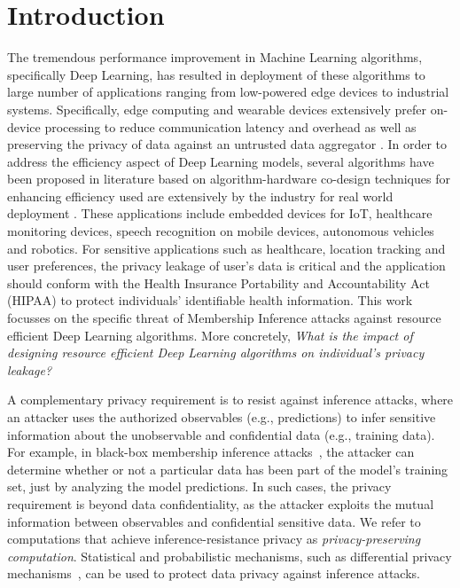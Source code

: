 \section{Introduction}\label{introduction}

The tremendous performance improvement in Machine Learning algorithms, specifically Deep Learning, has resulted in deployment of these algorithms to large number of applications ranging from low-powered edge devices to industrial systems.
Specifically, edge computing and wearable devices extensively prefer on-device processing to reduce communication latency and overhead as well as preserving the privacy of data against an untrusted data aggregator \cite{8110880}.
In order to address the efficiency aspect of Deep Learning models, several algorithms have been proposed in literature based on algorithm-hardware co-design techniques for enhancing efficiency used are extensively by the industry for real world deployment \cite{8114708}.
These applications include embedded devices for IoT, healthcare monitoring devices, speech recognition on mobile devices, autonomous vehicles and robotics.
For sensitive applications such as healthcare, location tracking and user preferences, the privacy leakage of user's data is critical and the application should conform with the Health Insurance Portability and Accountability Act (HIPAA) to protect individuals' identifiable health information.
This work focusses on the specific threat of Membership Inference attacks against resource efficient Deep Learning algorithms.
More concretely, \textit{What is the impact of designing resource efficient Deep Learning algorithms on individual's privacy leakage?}


A complementary privacy requirement is to resist against inference attacks, where an attacker uses the authorized observables (e.g., predictions) to infer sensitive information about the unobservable and confidential data (e.g., training data).  For example, in black-box membership inference attacks~\cite{shokri2017membership}, the attacker can determine whether or not a particular data has been part of the model's training set, just by analyzing the model predictions.  In such cases, the privacy requirement is beyond data confidentiality, as the attacker exploits the mutual information between observables and confidential sensitive data.  We refer to computations that achieve inference-resistance privacy as {\em privacy-preserving computation}.  Statistical and probabilistic mechanisms, such as differential privacy mechanisms~\cite{dwork2006calibrating, abadi2016deep}, can be used to protect data privacy against inference attacks.


